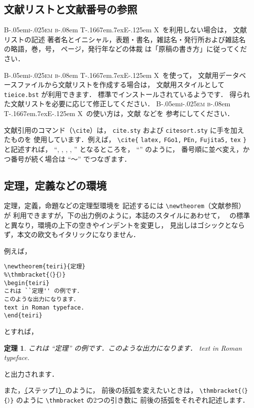 \documentclass[technicalreport]{ieicej}
\def\BibTeX{{\rmfamily B\kern-.05em{\scshape i\kern-.025em b}\kern-.08em
 T\kern-.1667em\lower.7ex\hbox{E}\kern-.125em X}}
\begin{document}
\subsection{文献リストと文献番号の参照}

\BibTeX\ を利用しない場合は，
文献リストの記述\ddash 
著者名とイニシャル，表題・書名，雑誌名・発行所および雑誌名の略語，巻，号，
ページ，発行年などの体裁\ddash 
は「原稿の書き方」に従ってください．

\BibTeX\ を使って，
文献用データベースファイルから文献リストを作成する場合は，
文献用スタイルとして \texttt{tieice.bst} が利用できます．
標準でインストールされているようです．
得られた文献リストを必要に応じて修正してください．
\BibTeX\ の使い方は，文献 \cite{latex,FMi1,Okumura3} などを
参考にしてください．

文献引用のコマンド（\verb/\cite/）は，
\texttt{cite.sty} および \texttt{citesort.sty} に手を加えたものを
使用しています．例えば，
\verb/\cite{/\allowbreak
\texttt{latex,}\allowbreak
\texttt{FGo1,}\allowbreak
\texttt{PEn,}\allowbreak
\texttt{Fujita5,}\allowbreak
\texttt{tex}\allowbreak
\verb/}/ と記述すれば，
``\cite{latex}, \cite{FGo1}, \cite{PEn}, 
\cite{Fujita5}, \cite{tex}'' となるところを，
``\cite{latex,FGo1,PEn,Fujita5,tex}'' のように，
番号順に並べ変え，かつ番号が続く場合は ``〜'' でつなぎます．

\subsection{定理，定義などの環境}

定理，定義，命題などの定理型環境を
記述するには \verb/\newtheorem/（文献\cite{latex,FMi1}参照）が
利用できますが，下の出力例のように，本誌のスタイルにあわせて，
\LaTeXe\ の標準と異なり，環境の上下の空きやインデントを変更し，
見出しはゴシックとならず，本文の欧文もイタリックになりません．

例えば，
\begin{verbatim}
\newtheorem{teiri}{定理}
%\thmbracket{（}{）}
\begin{teiri}
これは ``定理'' の例です．
このような出力になります．
text in Roman typeface.
\end{teiri}
\end{verbatim}
とすれば，
\newtheorem{teiri}{定理}%
\begin{teiri}
これは ``定理'' の例です．このような出力になります．
text in Roman typeface.
\end{teiri}
と出力されます．

また，\underline{（}ステップ1\underline{）}のように，
前後の括弧を変えたいときは，
\verb/\thmbracket{（}{）}/ のように \verb/\thmbracket/ の2つの引き数に
前後の括弧をそれぞれ記述します．
\end{document}

